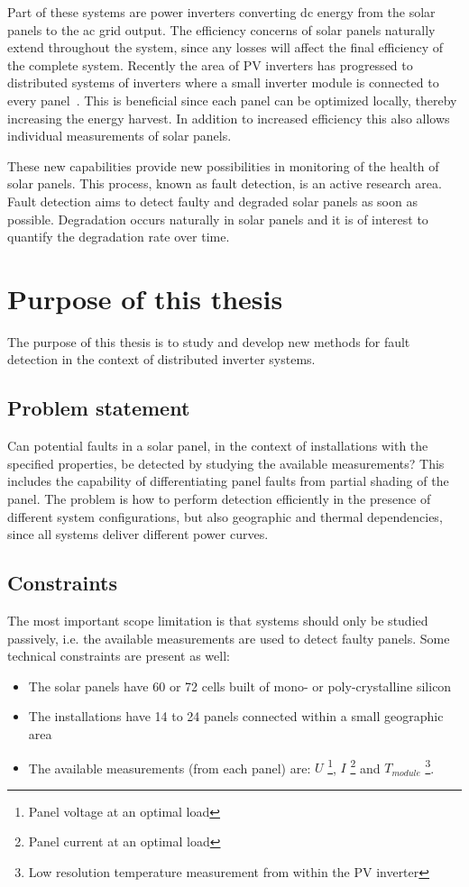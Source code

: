 Part of these systems are power inverters converting dc energy from the solar panels to the ac grid output.
The efficiency concerns of solar panels naturally extend throughout the system, since any losses will affect the final efficiency of the complete system.
Recently the area of PV inverters has progressed to distributed systems of inverters where a small inverter module is connected to every panel~\cite{Roman2006}.
This is beneficial since each panel can be optimized locally, thereby increasing the energy harvest.
In addition to increased efficiency this also allows individual measurements of solar panels.

These new capabilities provide new possibilities in monitoring of the health of solar panels.
This process, known as fault detection, is an active research area.
Fault detection aims to detect faulty and degraded solar panels as soon as possible. 
Degradation occurs naturally in solar panels and it is of interest to quantify the degradation rate over time.

\section{Purpose of this thesis}
The purpose of this thesis is to study and develop new methods for fault detection in the context of distributed inverter systems.

\subsection*{Problem statement}
Can potential faults in a solar panel, in the context of installations with the specified properties, be detected by studying the available measurements?
This includes the capability of differentiating panel faults from partial shading of the panel.
The problem is how to perform detection efficiently in the presence of different system configurations, but also geographic and thermal dependencies, since all systems deliver different power curves.

\newpage
\subsection*{Constraints}
The most important scope limitation is that systems should only be studied passively, i.e. the available measurements are used to detect faulty panels.  
Some technical constraints are present as well:
\begin{itemize}
\item The solar panels have 60 or 72 cells built of mono- or poly-crystalline silicon
\item The installations have 14 to 24 panels connected within a small geographic area
\item The available measurements (from each panel) are:
$U$ \footnote{Panel voltage at an optimal load},
$I$ \footnote{Panel current at an optimal load} and
$T_{module}$ \footnote{Low resolution temperature measurement from within the PV inverter}.

\end{itemize}

